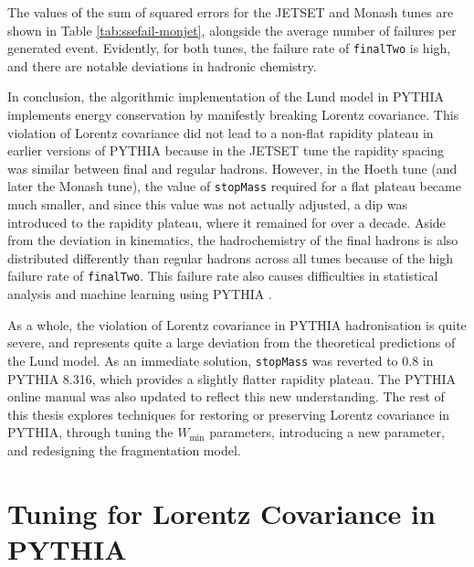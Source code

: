 \documentclass[12pt,a4paper]{report}
\begin{document}
The values of the sum of squared errors for the JETSET and Monash tunes are shown in Table \ref{tab:ssefail-monjet}, alongside the average number of failures per generated event. Evidently, for both tunes, the failure rate of \texttt{finalTwo} is high, and there are notable deviations in hadronic chemistry.

In conclusion, the algorithmic implementation of the Lund model in PYTHIA implements energy conservation by manifestly breaking Lorentz covariance. This violation of Lorentz covariance did not lead to a non-flat rapidity plateau in earlier versions of PYTHIA because in the JETSET tune the rapidity spacing was similar between final and regular hadrons. However, in the Hoeth tune (and later the Monash tune), the value of \texttt{stopMass} required for a flat plateau became much smaller, and since this value was not actually adjusted, a dip was introduced to the rapidity plateau, where it remained for over a decade. Aside from the deviation in kinematics, the hadrochemistry of the final hadrons is also distributed differently than regular hadrons across all tunes because of the high failure rate of \texttt{finalTwo}. This failure rate also causes difficulties in statistical analysis and machine learning using PYTHIA \cite{Butter:2025wxn,Assi:2025gog}.

As a whole, the violation of Lorentz covariance in PYTHIA hadronisation is quite severe, and represents quite a large deviation from the theoretical predictions of the Lund model. As an immediate solution, \texttt{stopMass} was reverted to 0.8 in PYTHIA 8.316, which provides a slightly flatter rapidity plateau. The PYTHIA online manual was also updated to reflect this new understanding. The rest of this thesis explores techniques for restoring or preserving Lorentz covariance in PYTHIA, through tuning the $W_\text{min}$ parameters, introducing a new parameter, and redesigning the fragmentation model.

\chapter{Tuning for Lorentz Covariance in PYTHIA}
\label{chap:tuning}
\end{document}
